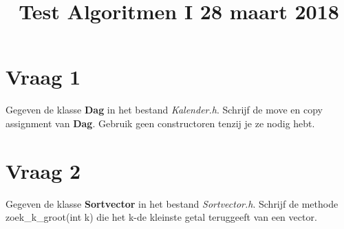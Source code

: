 \documentclass{article}
\begin{document}
\title{Test Algoritmen I 28 maart 2018}
\date{}
\author{}
\maketitle

\section{Vraag 1}
    Gegeven de klasse \textbf{Dag} in het bestand \textit{Kalender.h}. Schrijf de move en copy assignment van \textbf{Dag}. Gebruik geen constructoren tenzij je ze nodig hebt.
\section{Vraag 2}
    Gegeven de klasse \textbf{Sortvector} in het bestand \textit{Sortvector.h}. Schrijf de methode zoek\_k\_groot(int k) die het k-de kleinste getal teruggeeft van een vector.
\end{document}
